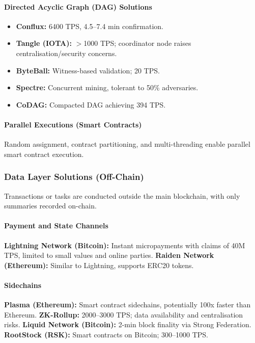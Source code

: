 \paragraph{Directed Acyclic Graph (DAG) Solutions}
\begin{itemize}
  \item \textbf{Conflux:} 6400 TPS, 4.5–7.4 min confirmation.
  \item \textbf{Tangle (IOTA):} $>$1000 TPS; coordinator node raises centralisation/security concerns.
  \item \textbf{ByteBall:} Witness-based validation; 20 TPS.
  \item \textbf{Spectre:} Concurrent mining, tolerant to 50\% adversaries.
  \item \textbf{CoDAG:} Compacted DAG achieving 394 TPS.
\end{itemize}

\paragraph{Parallel Executions (Smart Contracts)}
Random assignment, contract partitioning, and multi-threading enable parallel smart contract execution.

\subsubsection{Data Layer Solutions (Off-Chain)}
Transactions or tasks are conducted outside the main blockchain, with only summaries recorded on-chain.

\paragraph{Payment and State Channels}
\textbf{Lightning Network (Bitcoin):} Instant micropayments with claims of 40M TPS, limited to small values and online parties.  
\textbf{Raiden Network (Ethereum):} Similar to Lightning, supports ERC20 tokens.

\paragraph{Sidechains}
\textbf{Plasma (Ethereum):} Smart contract sidechains, potentially 100x faster than Ethereum.  
\textbf{ZK-Rollup:} 2000–3000 TPS; data availability and centralisation risks.  
\textbf{Liquid Network (Bitcoin):} 2-min block finality via Strong Federation.  
\textbf{RootStock (RSK):} Smart contracts on Bitcoin; 300–1000 TPS.


